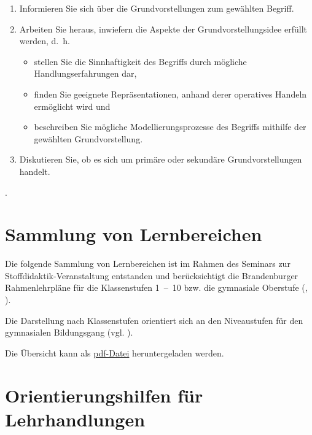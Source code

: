 \documentclass[
]{scrbook}
\providecommand{\tightlist}{%
  \setlength{\itemsep}{0pt}\setlength{\parskip}{0pt}}
\theoremstyle{definition}
\theoremstyle{definition}
\theoremstyle{definition}
\theoremstyle{definition}
\theoremstyle{remark}
\begin{document}
\begin{enumerate}
\def\labelenumi{\arabic{enumi}.}
\tightlist
\item
  Informieren Sie sich über die Grundvorstellungen zum gewählten Begriff.
\item
  Arbeiten Sie heraus, inwiefern die Aspekte der Grundvorstellungsidee erfüllt werden, d.~h.

  \begin{itemize}
  \tightlist
  \item
    stellen Sie die Sinnhaftigkeit des Begriffs durch mögliche Handlungserfahrungen dar,
  \item
    finden Sie geeignete Repräsentationen, anhand derer operatives Handeln ermöglicht wird und
  \item
    beschreiben Sie mögliche Modellierungsprozesse des Begriffs mithilfe der gewählten Grundvorstellung.
  \end{itemize}
\item
  Diskutieren Sie, ob es sich um primäre oder sekundäre Grundvorstellungen handelt.
\end{enumerate}

.

\appendix


\chapter{Sammlung von Lernbereichen}\label{sammlung-von-lernbereichen}

Die folgende Sammlung von Lernbereichen ist im Rahmen des Seminars zur Stoffdidaktik-Veranstaltung entstanden und berücksichtigt die Brandenburger Rahmenlehrpläne für die Klassenstufen 1~--~10 bzw. die gymnasiale Oberstufe (, ).

Die Darstellung nach Klassenstufen orientiert sich an den Niveaustufen für den gymnasialen Bildungsgang (vgl. ).

Die Übersicht kann als \href{files/Stoffdidaktik2024-SammlungLernbereiche.pdf}{pdf-Datei} heruntergeladen werden.

\chapter{Orientierungshilfen für Lehrhandlungen}\label{orientierungshilfen-fuxfcr-lehrhandlungen}
\end{document}
